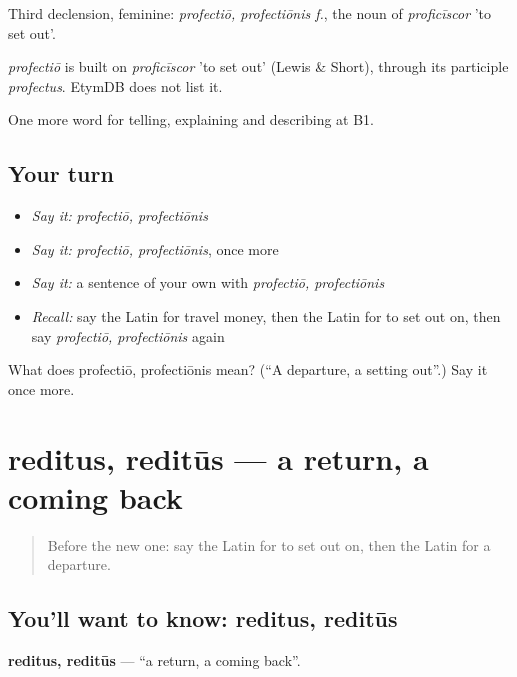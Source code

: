 Third declension, feminine: \emph{profectiō, profectiōnis f.}, the noun of \emph{proficīscor} 'to set out'.

\begin{cousinweb}
\emph{profectiō} is built on \emph{proficīscor} 'to set out' (Lewis \& Short), through its participle \emph{profectus}. EtymDB does not list it.
\end{cousinweb}

\begin{grammarlens}[title={What you've built}]
One more word for telling, explaining and describing at B1.
\end{grammarlens}

\subsection*{Your turn}
\begin{itemize}
\raggedright
  \item \emph{Say it:} \emph{profectiō, profectiōnis}
  \item \emph{Say it:} \emph{profectiō, profectiōnis}, once more
  \item \emph{Say it:} a sentence of your own with \emph{profectiō, profectiōnis}
  \item \emph{Recall:} say the Latin for travel money, then the Latin for to set out on, then say \emph{profectiō, profectiōnis} again
\end{itemize}

\begin{tcolorbox}[breakable,colback=teal!4,colframe=teal!35!black,title={Before you move on}]
What does profectiō, profectiōnis mean? (\textquotedblleft{}A departure, a setting out\textquotedblright{}.) Say it once more.
\end{tcolorbox}
\section[reditus, reditūs]{reditus, reditūs — a return, a coming back}

\label{lesson:LA-C428-reditus}



\begin{quote}
Before the new one: say the Latin for to set out on, then the Latin for a departure.
\end{quote}

\subsection*{You'll want to know: reditus, reditūs}
\textbf{reditus, reditūs} — \textquotedblleft{}a return, a coming back\textquotedblright{}.

